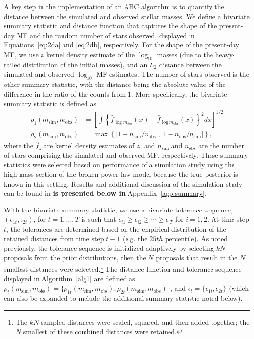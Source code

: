 \documentclass[ejs]{imsart}
\numberwithin{equation}{section}
\theoremstyle{plain}
\newcommand{\new}[1]{{\bf #1}}
\newcommand{\remove}[1]{\st{#1}}
\newcommand{\msim}{m_{\text{sim}}}
\newcommand{\mobs}{m_{\text{obs}}}
\newcommand{\nsim}{n_{\text{sim}}}
\newcommand{\nobs}{n_{\text{obs}}}
\begin{document}
A key step in the implementation of an ABC algorithm is to quantify the distance between the simulated and observed stellar masses.  We define a bivariate summary statistic and distance function that captures the shape of the present-day MF and the random number of stars observed, displayed in Equations~\eqref{eq:2da} and \eqref{eq:2db}, respectively.  For the shape of the present-day MF, we use a kernel density estimate of the $\log_{10}$ masses (due to the heavy-tailed distribution of the initial masses), and an $L_2$ distance between the simulated and observed $\log_{10}$ MF estimates.  
The number of stars observed is the other summary statistic, with the distance being the absolute value of the difference in the ratio of the counts from 1. More specifically, the bivariate summary statistic is defined as
\begin{align}
\rho_1(\msim, \mobs) &= \left [\displaystyle \int \left \{\hat f_{\log \msim}(x) - \hat f_{\log \mobs}(x) \right \}^2 dx \right]^{1/2} \label{eq:2da} \\ 
\rho_2(\msim, \mobs) &= \max\left\{\left|1 - \nsim/ \nobs\right |, \left|1 - \nobs/ \nsim\right |  \right\} \text{,}   \label{eq:2db}
\end{align}
where the $\hat f_z$ are kernel density estimates of $z$, and $\nsim$ and $\nobs$ are the number of stars comprising the simulated and observed MF, respectively.  These summary statistics were selected based on performance of a simulation study using the high-mass section of the broken power-law model because the true posterior is known in this setting.  Results and additional discussion of the simulation study \remove{can be found in} \new{is presented below in} Appendix~\ref{app:summary}.  


With the bivariate summary statistic, we use a bivariate tolerance sequence, $(\epsilon_{1t}, \epsilon_{2t})$, for $t = 1, \ldots, T$ is such that $\epsilon_{i1} \geq \epsilon_{i2} \geq \cdots \geq \epsilon_{iT}$ for $i = 1, 2$.  At time step $t$, the tolerances are determined based on the  empirical distribution of the retained distances from time step $t-1$ (e.g. the $25th$ percentile).  As noted previously, the tolerance sequence is initialized adaptively by selecting $kN$ proposals from the prior distributions, then the $N$ proposals that result in the $N$ smallest distances were selected.\footnote{The $kN$ sampled distances were scaled, squared, and then added together; the $N$ smallest of these combined distances were retained.}
The distance function and tolerance sequence displayed in Algorithm~\eqref{alg1} are defined as $\rho_t(\msim, \mobs) = \{\rho_{1t}(\msim, \mobs), \rho_{2t}(\msim, \mobs)\}$, and $\epsilon_t = \{\epsilon_{1t}, \epsilon_{2t}\}$ (which can also be expanded to include the additional summary statistic noted below).
\end{document}
